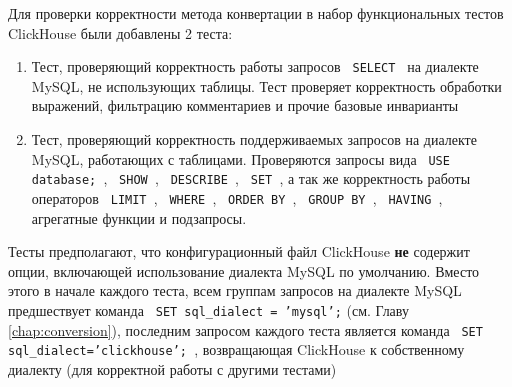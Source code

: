 Для проверки корректности метода конвертации в набор функциональных тестов ClickHouse были добавлены 2 теста:
\begin{enumerate}
    \item Тест, проверяющий корректность работы запросов \texttt{ SELECT } на диалекте MySQL, не использующих таблицы. Тест проверяет корректность обработки выражений, фильтрацию комментариев и прочие базовые инварианты
    \item Тест, проверяющий корректность поддерживаемых запросов на диалекте MySQL, работающих с таблицами. Проверяются запросы вида \texttt{ USE database; }, \texttt{ SHOW }, \texttt{ DESCRIBE }, \texttt{ SET }, а так же корректность работы операторов \texttt{ LIMIT }, \texttt{ WHERE }, \texttt{ ORDER BY }, \texttt{ GROUP BY }, \texttt{ HAVING }, агрегатные функции и подзапросы.
\end{enumerate}

Тесты предполагают, что конфигурационный файл ClickHouse \textbf{не} содержит опции, включающей использование диалекта MySQL по умолчанию. Вместо этого в начале каждого теста, всем группам запросов на диалекте MySQL предшествует команда \texttt{ SET sql_dialect = 'mysql';} (см. Главу \ref{chap:conversion}), последним запросом каждого теста является команда \texttt{ SET sql_dialect='clickhouse'; }, возвращающая ClickHouse к собственному диалекту (для корректной работы с другими тестами)
